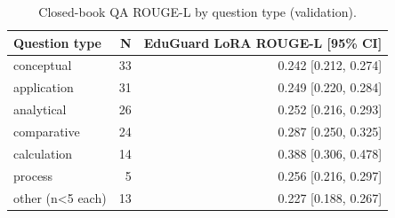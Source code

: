 \begin{table}[t]
\centering
\caption{Closed-book QA ROUGE-L by question type (validation).}
\label{tab:t6_qa_by_type}
\begin{tabular}{lrr}
\toprule
Question type & N & EduGuard LoRA ROUGE-L [95\% CI] \\
\midrule
conceptual & 33 & 0.242 [0.212, 0.274] \\
application & 31 & 0.249 [0.220, 0.284] \\
analytical & 26 & 0.252 [0.216, 0.293] \\
comparative & 24 & 0.287 [0.250, 0.325] \\
calculation & 14 & 0.388 [0.306, 0.478] \\
process & 5 & 0.256 [0.216, 0.297] \\
other (n<5 each) & 13 & 0.227 [0.188, 0.267] \\
\bottomrule
\end{tabular}
\end{table}
